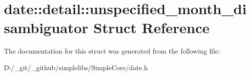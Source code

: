 \hypertarget{structdate_1_1detail_1_1unspecified__month__disambiguator}{}\section{date\+::detail\+::unspecified\+\_\+month\+\_\+disambiguator Struct Reference}
\label{structdate_1_1detail_1_1unspecified__month__disambiguator}


The documentation for this struct was generated from the following file\+:\begin{DoxyCompactItemize}
\item 
D\+:/\+\_\+git/\+\_\+github/simplelibs/\+Simple\+Core/date.\+h\end{DoxyCompactItemize}
